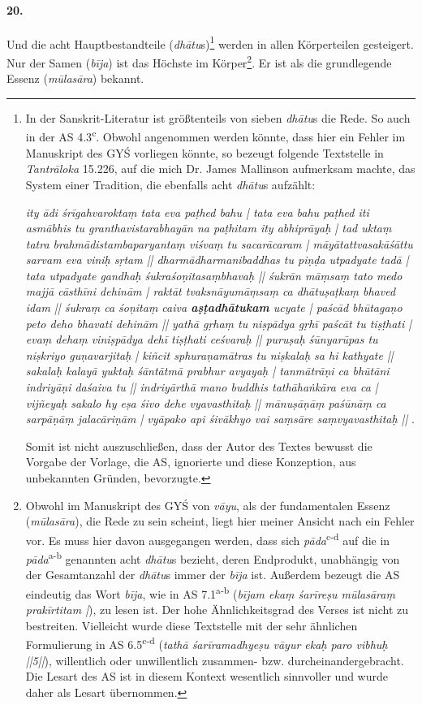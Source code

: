 \documentclass[a4paper,12pt]{article}
\begin{document}
\paragraph{20.} Und die acht Hauptbestandteile (\textit{dhātu}s)\footnote{In der Sanskrit-Literatur ist größtenteils von sieben \textit{dhātu}s die Rede. So auch in der AS 4.3\textsuperscript{c}. Obwohl angenommen werden könnte, dass hier ein Fehler im Manuskript des GYŚ vorliegen könnte, so bezeugt folgende Textstelle in \textit{Tantrāloka} 15.226, auf die mich Dr. James Mallinson aufmerksam machte, das System einer Tradition, die ebenfalls acht \textit{dhātu}s aufzählt:

  \textit{ity ādi śrīgahvaroktaṃ tata eva paṭhed bahu | tata eva bahu paṭhed iti asmābhis tu granthavistarabhayān na paṭhitam ity abhiprāyaḥ | tad uktaṃ tatra brahmādistambaparyantaṃ viśvaṃ tu sacarācaram | māyātattvasakāśāttu sarvam eva viniḥ sṛtam || dharmādharmanibaddhas tu piṇḍa utpadyate tadā | tata utpadyate gandhaḥ śukraśoṇitasaṃbhavaḥ || śukrān māṃsaṃ tato medo majjā cāsthīni dehinām | raktāt tvaksnāyumāṃsaṃ ca dhātuṣaṭkaṃ bhaved idam || śukraṃ ca śoṇitaṃ caiva \textbf{aṣṭadhātukam} ucyate | paścād bhūtagaṇo peto deho bhavati dehinām || yathā gṛhaṃ tu niṣpādya gṛhī paścāt tu tiṣṭhati | evaṃ dehaṃ viniṣpādya dehī tiṣṭhati ceśvaraḥ || puruṣaḥ śūnyarūpas tu niṣkriyo guṇavarjitaḥ | kiñcit sphuraṇamātras tu niṣkalaḥ sa hi kathyate || sakalaḥ kalayā yuktaḥ śāntātmā prabhur avyayaḥ | tanmātrāṇi ca bhūtāni indriyāṇi daśaiva tu || indriyārthā mano buddhis tathāhaṅkāra eva ca | vijñeyaḥ sakalo hy eṣa śivo dehe vyavasthitaḥ || mānuṣāṇāṃ paśūnāṃ ca sarpāṇāṃ jalacāriṇām | vyāpako api śivākhyo vai saṃsāre saṃvyavasthitaḥ ||}  \parencite{tantraloka}.

  Somit ist nicht auszuschließen, dass der Autor des Textes bewusst die Vorgabe der Vorlage, die AS, ignorierte und diese Konzeption, aus unbekannten Gründen, bevorzugte.}  werden in allen Körperteilen gesteigert. Nur der Samen (\textit{bīja}) ist das Höchste im Körper\footnote{Obwohl im Manuskript des GYŚ von \textit{vāyu}, als der fundamentalen Essenz (\textit{mūlasāra}), die Rede zu sein scheint, liegt hier meiner Ansicht nach ein Fehler vor. Es muss hier davon ausgegangen werden, dass sich \textit{pāda}\textsuperscript{c-d} auf die in \textit{pāda}\textsuperscript{a-b} genannten acht \textit{dhātu}s bezieht, deren Endprodukt, unabhängig von der Gesamtanzahl der \textit{dhātu}s immer der \textit{bīja} ist. Außerdem bezeugt die AS eindeutig das Wort \textit{bīja}, wie in AS 7.1\textsuperscript{a-b} (\textit{bījam ekaṃ śarīreṣu mūlasāraṃ prakīrtitam |}), zu lesen ist. Der hohe Ähnlichkeitsgrad des Verses ist nicht zu bestreiten. Vielleicht wurde diese Textstelle mit der sehr ähnlichen Formulierung in AS 6.5\textsuperscript{c-d} (\textit{tathā śarīramadhyeṣu vāyur ekaḥ paro vibhuḥ ||5||}), willentlich oder unwillentlich zusammen- bzw. durcheinandergebracht. Die Lesart des AS ist in diesem Kontext wesentlich sinnvoller und wurde daher als Lesart übernommen.}. Er ist als die grundlegende Essenz (\textit{mūlasāra}) bekannt. 
\end{document}
